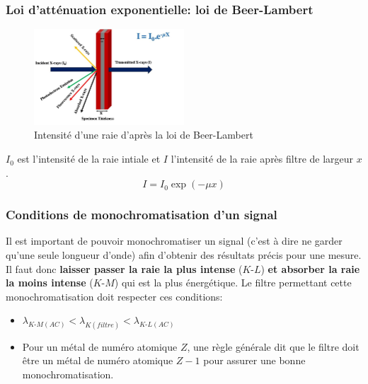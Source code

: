 \documentclass{article}
\begin{document}
\subsubsection{Loi d'atténuation exponentielle: loi de Beer-Lambert}

\setlength{\intextsep}{0pt}
\begin{figure} %
    \centering
    \includegraphics[width=0.5\textwidth]{Fig/Beer-Lambert-law-X-rays-to-solid-matter-interaction.png} 
    \caption{Intensité d'une raie d'après la loi de Beer-Lambert}
    \label{fig:Beer Lambert}
\end{figure}


$I_0$ est l'intensité de la raie intiale et $I$ l'intensité de la raie après filtre de largeur $x$.
\vspace{1cm}
{\Large$$I=I_0 \exp{(-\mu x)}$$} 

\vspace{3.5cm}

\subsubsection{Conditions de monochromatisation d'un signal}

Il est important de pouvoir monochromatiser un signal (c'est à dire ne garder qu'une seule longueur d'onde) afin d'obtenir des résultats précis pour une mesure. 
Il faut donc \textbf{laisser passer la raie la plus intense} ($K\text{-}L$) \textbf{et absorber la raie la moins intense} ($K\text{-}M$) qui est la plus énergétique.
Le filtre permettant cette monochromatisation doit respecter ces conditions:
\begin{itemize}[label=$\ast$]
    \item  $\lambda_{K\text{-}M (AC)} < \lambda_{K (filtre)} < \lambda_{K\text{-}L (AC)}$
    \item Pour un métal de numéro atomique $Z$, une règle générale dit que le filtre doit être un métal de numéro atomique $Z-1$ pour assurer une bonne monochromatisation.
\end{itemize}
\end{document}
